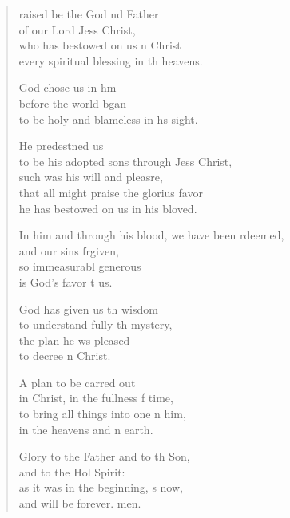 \begin{verse}
  \begin{patverse}
raised be the God nd Father\Med\\
of our Lord Jess Christ,\\
who has bestowed on us n Christ\Med\\
every spiritual blessing in th heavens.

God chose us in h\pointup{\i}m\Flex\\
before the world bgan\Med\\
to be holy and blameless in h\pointup{\i}s sight.

He predestned us\Med\\
to be his adopted sons through Jess Christ,\\
such was his will and pleasre,\Flex\\
that all might praise the glorius favor\Med\\
he has bestowed on us in his bloved.

In him and through his blood, we have been rdeemed,\Med\\
and our sins frgiven,\\
so immeasurabl generous\Med\\
is God’s favor t us.

God has given us th wisdom\Med\\
to understand fully th mystery,\\
the plan he ws pleased\Med\\
to decree \pointup{\i}n Christ.

A plan to be carred out\Med\\
in Christ, in the fullness f time,\\
to bring all things into one n him,\Med\\
in the heavens and n earth.

Glory to the Father and to th Son,\Med\\
and to the Hol Spirit:\\
as it was in the beginning, s now,\Med\\
and will be forever. men.
  \end{patverse}
\end{verse}
